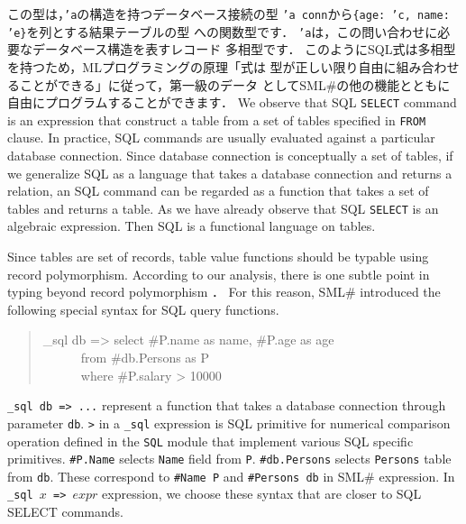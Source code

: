 \documentclass{jbook}
\newcommand{\smlsharp}{SML\#}
\newcommand{\myem}{\mbox{\ \ }}
\newenvironment{program}{\begin{quote}\begin{tt}}%
                        {\end{tt}\end{quote}}
\begin{document}
	この型は，{\tt 'a}の構造を持つデータベース接続の型
{\tt  'a conn}から{\tt \{age: 'c, name: 'e\}}を列とする結果テーブルの型
への関数型です．
	{\tt 'a}は，この問い合わせに必要なデータベース構造を表すレコード
多相型です．
	このようにSQL式は多相型を持つため，MLプログラミングの原理「式は
型が正しい限り自由に組み合わせることができる」に従って，第一級のデータ
として\smlsharp{}の他の機能とともに自由にプログラムすることができます．
\else%
	We observe that SQL {\tt SELECT} command is an expression that
construct a table from a set of tables specified in {\tt FROM} clause.
	In practice, SQL commands are usually evaluated against a
particular database connection.
	Since database connection is conceptually a set of tables, 
if we generalize SQL as a language that takes a database connection and
returns a relation, an SQL command can be regarded as a function that
takes a set of tables and returns a table.
	As we have already observe that SQL {\tt SELECT} is an algebraic
expression.
	Then SQL is a functional language on tables.

	Since tables are set of records, table value functions should be
typable using record polymorphism.
	According to our analysis, there is one subtle point in typing
beyond record polymorphism \cite{ohori11icfp}．
	For this reason, \smlsharp{} introduced the following special
syntax for SQL query functions.
\begin{program}
\_sql db => select \#P.name as name, \#P.age as age\\
\myem\myem\myem from \#db.Persons as P\\
\myem\myem\myem where \#P.salary > 10000
\end{program}
	{\tt \_sql db => ...} represent a function that takes a database
connection through parameter {\tt db}.
	{\tt >} in a {\tt \_sql} expression is SQL primitive
for numerical comparison operation
defined in the {\tt SQL} module that implement various SQL specific
primitives.
	{\tt \#P.Name} selects {\tt Name} field from {\tt P}.
{\tt \#db.Persons} selects {\tt Persons} table from {\tt db}.
	These correspond to {\tt \#Name P} and {\tt \#Persons db} in
\smlsharp{} expression.
	In {\tt \_sql $x$ => $expr$} expression, we choose these syntax
that are closer to SQL SELECT commands.
	
\end{document}
